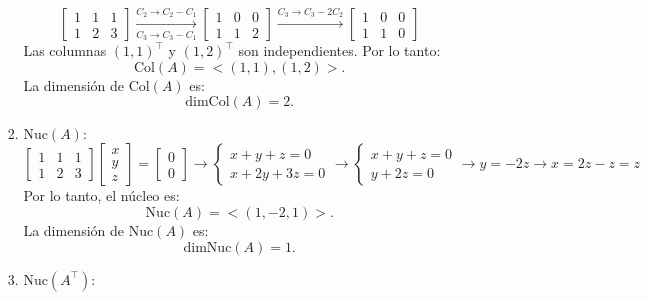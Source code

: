 \begin{enumerate}[label=\color{red}\textbf{\arabic*)}]
\begin{enumerate}[label=\color{red}\textbf{\alph*)}]
\begin{enumerate}[label=\arabic*)]
                \[
                \begin{bmatrix} 
                    1 & 1 & 1\\
                    1 & 2 & 3
                \end{bmatrix}\xrightarrow[C_3\to C_3-C_1]{C_2\to C_2-C_1} \begin{bmatrix} 
                    1 & 0 & 0\\
                    1 & 1 & 2
                \end{bmatrix}\xrightarrow{C_3\to C_3-2C_2}\begin{bmatrix} 
                    1 & 0 & 0\\
                    1 & 1 & 0
                \end{bmatrix}  
                \] 
                Las columnas $(1,1)^\intercal$ y $(1,2)^\intercal$ son independientes. Por lo tanto: \[
                \mathrm{Col}(A)= <(1,1),(1,2)>.
                \] 
                La dimensión de $\mathrm{Col}(A)$ es: \[
                \mathrm{dimCol}(A)=2.
                \] 
            \item $\mathrm{Nuc}(A):$ \[
            \begin{bmatrix} 
                1 & 1 & 1\\
                1 & 2 & 3
            \end{bmatrix} \begin{bmatrix} 
            x\\ y\\z 
            \end{bmatrix} =\begin{bmatrix} 
            0\\0 
            \end{bmatrix} \longrightarrow \begin{cases}
                x+y+z=0\\
                x+2y+3z=0
            \end{cases}\longrightarrow \begin{cases}
                x+y+z=0\\
                y+2z=0
            \end{cases}\longrightarrow y=-2z\longrightarrow x=2z-z=z
            \] 
            Por lo tanto, el núcleo es: \[
            \mathrm{Nuc}(A)= <(1,-2,1) >.
            \] 
            La dimensión de $\mathrm{Nuc}(A)$ es: \[
            \mathrm{dimNuc}(A)=1.
            \] 
        \item $\mathrm{Nuc}(A^\intercal):$ \[
\]
\end{enumerate}
\end{enumerate}
\end{enumerate}
